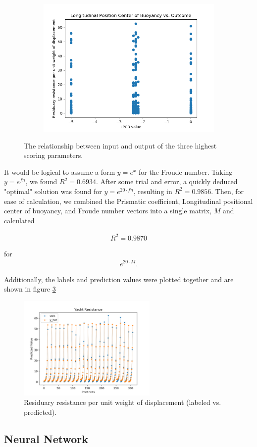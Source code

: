 \documentclass[11pt,a4paper]{article}
\begin{document}
\begin{figure}[ht]
\begin{subfigure}[h]{0.4\textwidth}
		\includegraphics[width=\textwidth]{lpcb}
		\caption{ }
		\label{fig:lpcb}
	\end{subfigure}
	\caption{The relationship between input and output of the three highest scoring parameters.}
	\label{fig:r2highest}
\end{figure}

It would be logical to assume a form $y = e^x$ for the Froude number. Taking $y = e^{fn}$, we found $R^2 = 0.6934$. After some trial and error, a quickly deduced "optimal" solution was found for $y = e^{20\cdot fn}$, resulting in $R^2 = 0.9856$. Then, for ease of calculation, we combined the Prismatic coefficient, Longitudinal positional center of buoyancy, and Froude number vectors into a single matrix, $M$ and calculated 

\begin{align*}
R^2 = 0.9870
\end{align*}

for
\begin{align*}
e^{20 \cdot M}.
\end{align*}

Additionally, the labels and prediction values were plotted together and are shown in figure \ref{fig:yacht_best}

\begin{figure}[ht]
\centering
\includegraphics[width=0.6\textwidth]{yacht_best}
\caption{Residuary resistance per unit weight of displacement (labeled vs. predicted).}
\label{fig:yacht_best}
\end{figure}

\subsection{Neural Network}
\end{document}

